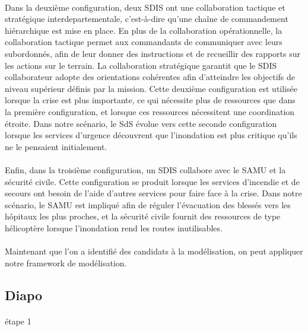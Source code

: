 \paragraph{}
Dans la deuxième configuration, deux SDIS ont une collaboration tactique et
stratégique interdepartementale, c'est-à-dire qu'une chaîne de commandement hiérarchique est mise en
place. En plus de la collaboration opérationnelle, la collaboration tactique
permet aux commandants de communiquer avec leurs subordonnés, afin de leur
donner des instructions et de recueillir des rapports sur les actions sur le
terrain. La collaboration stratégique garantit que le SDIS collaborateur adopte
des orientations cohérentes afin d'atteindre les objectifs de niveau supérieur
définis par la mission. Cette deuxième configuration est utilisée lorsque la
crise est plus importante, ce qui nécessite plus de ressources que dans la
première configuration, et lorsque ces ressources nécessitent une coordination
étroite. Dans notre scénario, le SdS évolue vers cette seconde configuration
lorsque les services d'urgence découvrent que l'inondation est plus critique
qu'ils ne le pensaient initialement.

\paragraph{}
Enfin, dans la troisième configuration, un SDIS collabore avec le SAMU et la
sécurité civile. Cette configuration se produit lorsque les services d'incendie
et de secours ont besoin de l'aide d'autres services pour faire face à la crise.
Dans notre scénario, le SAMU est impliqué afin de réguler l'évacuation des
blessés vers les hôpitaux les plus proches, et la sécurité civile fournit des
ressources de type hélicoptère lorsque l'inondation rend les routes
inutilisables.

\paragraph{} 
Maintenant que l'on a identifié des candidats à la modélisation, on
peut appliquer notre framework de modélisation. 


\subsection{Diapo }

\paragraph{}
étape 1 

